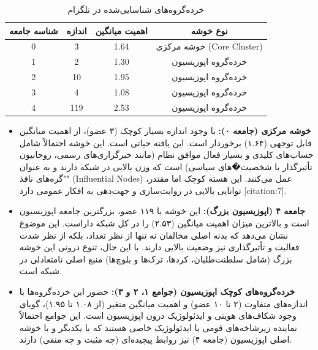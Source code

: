 \documentclass{article}
\begin{document}
	\begin{table}[h!]
		\centering
		\caption{خرده‌گروه‌های شناسایی‌شده در تلگرام}
		\label{tab:communities_telegram}
		\begin{tabular}{@{}cccc@{}}
			\toprule
			\textbf{شناسه جامعه} & \textbf{اندازه} & \textbf{اهمیت میانگین} & \textbf{نوع خوشه} \\ \midrule
			0                    & 3                & 1.64                   & خوشه مرکزی (Core Cluster) \\
			1                    & 2                & 1.30                   & خرده‌گروه اپوزیسیون \\
			2                    & 10               & 1.95                   & خرده‌گروه اپوزیسیون \\
			3                    & 4                & 1.08                   & خرده‌گروه اپوزیسیون \\
			4                    & 119              & 2.53                   & خرده‌گروه اپوزیسیون \\ \bottomrule
		\end{tabular}
	\end{table}
	
	\begin{itemize}
		\item \textbf{خوشه مرکزی (جامعه ۰):} با وجود اندازه بسیار کوچک (۳ عضو)، از اهمیت میانگین قابل توجهی (۱.۶۴) برخوردار است. این یافته حیاتی است. این خوشه احتمالاً شامل حساب‌های کلیدی و بسیار فعال موافق نظام (مانند خبرگزاری‌های رسمی، روحانیون تأثیرگذار یا شخصیت�های سیاسی) است که وزن بالایی در شبکه دارند و به عنوان "گره‌های نافذ" (Influential Nodes) عمل می‌کنند. این هسته کوچک اما مقتدر، توانایی بالایی در روایت‌سازی و جهت‌دهی به افکار عمومی دارد [citation:7].
		\item \textbf{جامعه ۴ (اپوزیسیون بزرگ):} این خوشه با ۱۱۹ عضو، بزرگترین جامعه اپوزیسیون است و بالاترین میزان اهمیت میانگین (۲.۵۳) را در کل شبکه داراست. این موضوع نشان می‌دهد که بدنه اصلی مخالفان نه تنها از نظر تعداد، بلکه از نظر شدت فعالیت و تأثیرگذاری نیز وضعیت بالایی دارند. با این حال، تنوع درونی این خوشه بزرگ (شامل سلطنت‌طلبان، کردها، ترک‌ها و بلوچ‌ها) منبع اصلی نامتعادلی در شبکه است.
		\item \textbf{خرده‌گروه‌های کوچک اپوزیسیون (جوامع ۱، ۲ و ۳):} حضور این خرده‌گروه‌ها با اندازه‌های متفاوت (۲ تا ۱۰ عضو) و اهمیت میانگین متغیر (از ۱.۰۸ تا ۱.۹۵)، گویای وجود شکاف‌های هویتی و ایدئولوژیک درون اپوزیسیون است. این جوامع احتمالاً نماینده زیرشاخه‌های قومی یا ایدئولوژیک خاصی هستند که با یکدیگر و با خوشه اصلی اپوزیسیون (جامعه ۴) نیز روابط پیچیده‌ای (چه مثبت و چه منفی) دارند.
	\end{itemize}
	
\end{document}
